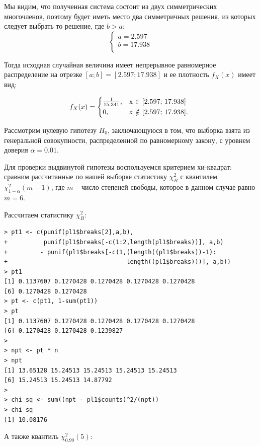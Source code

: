 \documentclass[14pt,a4paper]{scrartcl}
\begin{document}
Мы видим, что полученная система состоит из двух симметрических многочленов, поэтому будет иметь место два симметричных решения, из которых следует выбрать то решение, где $b > a$: \\
\begin{equation*}
\begin{cases*}
a=2.597 \\
b=17.938 \\
\end{cases*}
\end{equation*}

Тогда исходная случайная величина имеет непрерывное равномерное распределение на отрезке $[a;b] = [2.597; 17.938]$ и ее плотность $f_X(x)$ имеет вид:

\begin{equation*}
f_X(x) = 
\begin{cases*}
\frac{1}{15.341}, & x $\in$ [2.597; 17.938]  \\
0, & x $\notin$ [2.597; 17.938]. \\
\end{cases*}
\end{equation*}


Рассмотрим нулевую гипотезу $H_0$, заключающуюся в том, что выборка взята из генеральной совокупности, распределенной по равномерному закону, с уровнем доверия $\alpha = 0.01$.


Для проверки выдвинутой гипотезы воспользуемся критерием хи-квадрат: сравним рассчитанные по нашей выборке статистику $\chi^2_B$ с квантилем ${\chi^2_{1-\alpha} (m-1)}$, где $m$ -- число степеней свободы, которое в данном случае равно $m=6$.


Рассчитаем статистику $\chi^2_B$:

\begin{verbatim}
> pt1 <- c(punif(pl1$breaks[2],a,b),
+          punif(pl1$breaks[-c(1:2,length(pl1$breaks))], a,b)
+         - punif(pl1$breaks[-c(1,(length((pl1$breaks))-1):
+                                 length((pl1$breaks)))], a,b))
> pt1
[1] 0.1137607 0.1270428 0.1270428 0.1270428 0.1270428
[6] 0.1270428 0.1270428
> pt <- c(pt1, 1-sum(pt1))
> pt
[1] 0.1137607 0.1270428 0.1270428 0.1270428 0.1270428
[6] 0.1270428 0.1270428 0.1239827
> 
> npt <- pt * n
> npt
[1] 13.65128 15.24513 15.24513 15.24513 15.24513
[6] 15.24513 15.24513 14.87792
> 
> chi_sq <- sum((npt - pl1$counts)^2/(npt))
> chi_sq
[1] 10.08176
\end{verbatim}

А также квантиль ${\chi^2_{0.99} (5)}$:
\end{document}
